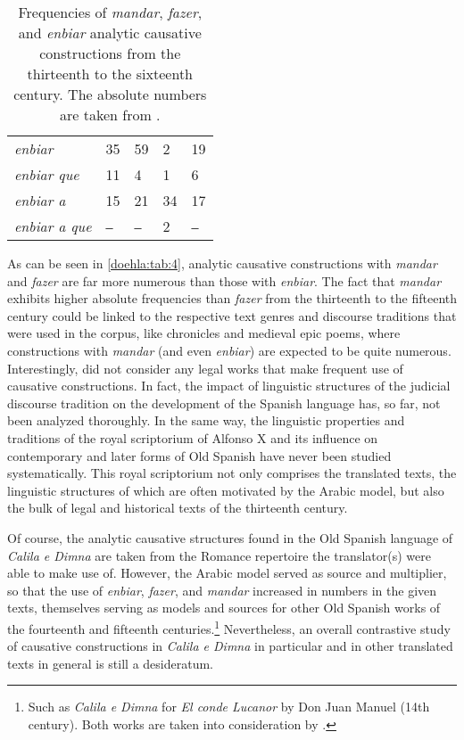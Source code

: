 \documentclass[output=paper]{langscibook}
\begin{document}
\begin{table}
\begin{tabularx}{\textwidth}{L{3cm}QQQQ}
        \textit{enbiar} \Inf{}            & 35              & 59              & 2               & 19              \\
        \textit{enbiar que} \CLAUSE{}     & 11              & 4               & 1               & 6               \\
        \textit{enbiar a} \Inf{}          & 15              & 21              & 34              & 17              \\
        \textit{enbiar a que}   \CLAUSE{} & ‒               & ‒               & 2               & ‒\\ \bottomrule\midrule
    \end{tabularx}
    \caption{Frequencies of \textit{mandar}, \textit{fazer}, and \textit{enbiar} analytic causative constructions from the thirteenth to the sixteenth century. The absolute numbers are taken from \citet[88 and 148]{sanaphre_villanueva_analytic_2010}.}
    \label{doehla:tab:4}
\end{table}


As can be seen in \autoref{doehla:tab:4}, analytic causative constructions with \textit{mandar} and \textit{fazer} are far more numerous than those with \textit{enbiar}. The fact that \textit{mandar} exhibits higher absolute frequencies than \textit{fazer} from the thirteenth to the fifteenth century could be linked to the respective text genres and discourse traditions that were used in the corpus, like chronicles and medieval epic poems, where constructions with \textit{mandar} (and even \textit{enbiar}) are expected to be quite numerous. Interestingly, \citet[4]{sanaphre_villanueva_analytic_2010} did not consider any legal works that make frequent use of causative constructions. In fact, the impact of linguistic structures of the judicial discourse tradition on the development of the Spanish language has, so far, not been analyzed thoroughly. In the same way, the linguistic properties and traditions of the royal scriptorium of Alfonso X and its influence on contemporary and later forms of Old Spanish have never been studied systematically. This royal scriptorium not only comprises the translated texts, the linguistic structures of which are often motivated by the Arabic model, but also the bulk of legal and historical texts of the thirteenth century. 

Of course, the analytic causative structures found in the Old Spanish language of \textit{Calila e Dimna} are taken from the Romance repertoire the translator(s) were able to make use of. However, the Arabic model served as source and multiplier, so that the use of \textit{enbiar}, \textit{fazer}, and \textit{mandar} increased in numbers in the given texts, themselves serving as models and sources for other Old Spanish works of the fourteenth and fifteenth centuries.\footnote{Such as \textit{Calila e Dimna} for \textit{El conde Lucanor} by Don Juan Manuel (14th century). Both works are taken into consideration by \citet{sanaphre_villanueva_analytic_2010}.} Nevertheless, an overall contrastive study of causative constructions in \textit{Calila e Dimna} in particular and in other translated texts in general is still a desideratum.
\end{document}

